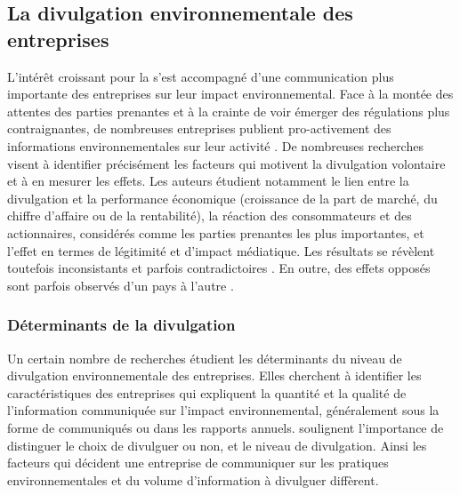     \subsection{La divulgation environnementale des entreprises}

        L'intérêt croissant pour la \rse s'est accompagné d'une communication plus importante des entreprises sur leur impact environnemental. Face à la montée des attentes des parties prenantes et à la crainte de voir émerger des régulations plus contraignantes, de nombreuses entreprises publient pro-activement des informations environnementales sur leur activité \parencite{cormier2007revisited, cormier1999corporate}. De nombreuses recherches visent à identifier précisément les facteurs qui motivent la divulgation volontaire et à en mesurer les effets. Les auteurs étudient notamment le lien entre la divulgation et la performance économique (croissance de la part de marché, du chiffre d'affaire ou de la rentabilité), la réaction des consommateurs et des actionnaires, considérés comme les parties prenantes les plus importantes, et l'effet en termes de légitimité et d'impact médiatique. Les résultats se révèlent toutefois inconsistants et parfois contradictoires \parencite{gray2001social}. En outre, des effets opposés sont parfois observés d'un pays à l'autre \parencite{bouten2012how, cormier2007revisited}.

        \subsubsection{Déterminants de la divulgation}
            Un certain nombre de recherches étudient les déterminants du niveau de divulgation environnementale des entreprises. Elles cherchent à identifier les caractéristiques des entreprises qui expliquent la quantité et la qualité de l'information communiquée sur l'impact environnemental, généralement sous la forme de communiqués ou dans les rapports annuels. \textcite{bouten2012how} soulignent l'importance de distinguer le choix de divulguer ou non, et le niveau de divulgation. Ainsi les facteurs qui décident une entreprise de communiquer sur les pratiques environnementales et du volume d'information à divulguer diffèrent. \\

